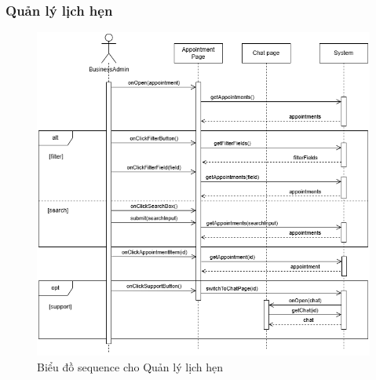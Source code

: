 \subsubsection{Quản lý lịch hẹn}
\begin{figure}[H]
    \centering
     \includegraphics[width=1\textwidth]{Dg_Sequence/AppointmentManagement.png}
    \vspace{0.5cm}
    \caption{Biểu đồ sequence cho Quản lý lịch hẹn}
    \label{fig:enter-label}
\end{figure}

